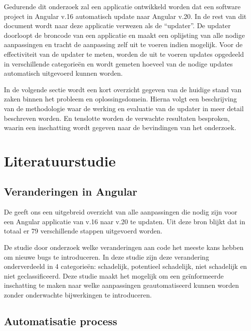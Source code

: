Gedurende dit onderzoek zal een applicatie ontwikkeld worden dat een software project in Angular v.16 automatisch update naar Angular v.20.
In de rest van dit document wordt naar deze applicatie verwezen als de ``updater''.
De updater doorloopt de broncode van een applicatie en maakt een oplijsting van alle nodige aanpassingen en tracht de aanpassing zelf uit te voeren indien mogelijk.
Voor de effectiviteit van de updater te meten, worden de uit te voeren updates opgedeeld in verschillende categorieën en wordt gemeten hoeveel van de nodige updates automatisch uitgevoerd kunnen worden.

In de volgende sectie wordt een kort overzicht gegeven van de huidige stand van zaken binnen het probleem en oplossingsdomein.
Hierna volgt een beschrijving van de methodologie waar de werking en evaluatie van de updater in meer detail beschreven worden.
En tenslotte worden de verwachte resultaten besproken, waarin een inschatting wordt gegeven naar de bevindingen van het onderzoek.

\section{Literatuurstudie}
\label{sec:literatuurstudie}

\subsection{Veranderingen in Angular}

De \textcite{AngularUpdateGuide2025} geeft ons een uitgebreid overzicht van alle aanpassingen die nodig zijn voor een Angular applicatie van v.16 naar v.20 te updaten. 
Uit deze bron blijkt dat in totaal er 79 verschillende stappen uitgevoerd worden.

De studie door \textcite{Bavota2012} onderzoek welke veranderingen aan code het meeste kans hebben om nieuwe bugs te introduceren.
In deze studie zijn deze verandering onderverdeeld in 4 categorieën: schadelijk, potentieel schadelijk, niet schadelijk en niet geclassificeerd.
Deze studie maakt het mogelijk om een geïnformeerde inschatting te maken naar welke aanpassingen geautomatiseerd kunnen worden zonder onderwachte bijwerkingen te introduceren.

\subsection{Automatisatie process}

